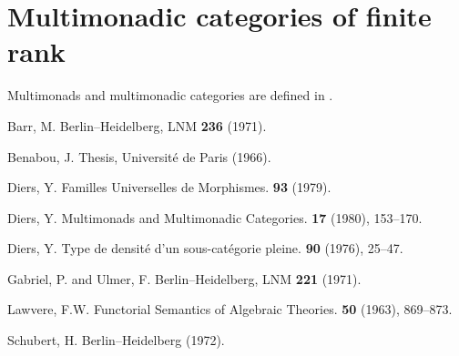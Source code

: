 \documentclass{article}
\begin{document}
\section{Multimonadic categories of finite rank}
\label{6}

Multimonads and multimonadic categories are defined in \cite{3}.






\nocite{*}

\begin{thebibliography}{8}

  {\sc Barr, M.}
  \newblock Berlin--Heidelberg, LNM \textbf{236} (1971).

  {\sc Benabou, J.}
  \newblock Thesis, Universit\'{e} de Paris (1966).

  {\sc Diers, Y.}
  \newblock Familles Universelles de Morphismes.
   \textbf{93} (1979).

  {\sc Diers, Y.}
  \newblock Multimonads and Multimonadic Categories.
   \textbf{17} (1980), 153--170.

  {\sc Diers, Y.}
  \newblock Type de densit\'{e} d'un sous-cat\'{e}gorie pleine.
   \textbf{90} (1976), 25--47.

  {\sc Gabriel, P. and Ulmer, F.}
  \newblock Berlin--Heidelberg, LNM \textbf{221} (1971).

  {\sc Lawvere, F.W.}
  \newblock Functorial Semantics of Algebraic Theories.
   \textbf{50} (1963), 869--873.

  {\sc Schubert, H.}
  \newblock Berlin--Heidelberg (1972).

\end{thebibliography}
\end{document}
